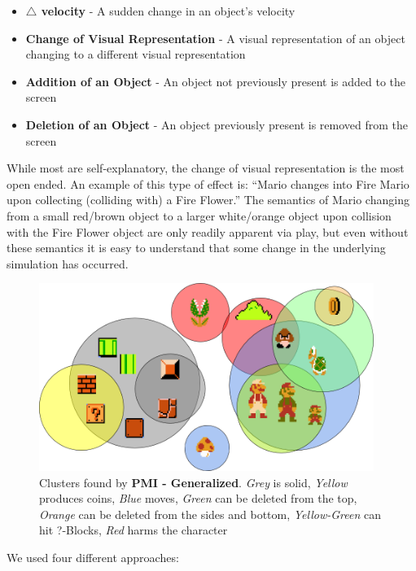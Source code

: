 \documentclass[12pt]{report}
\begin{document}
\begin{itemize}
\item \textbf{$\triangle$ velocity} - A sudden change in an object's velocity
\item  \textbf{Change of Visual Representation} - A visual representation of an object changing to a different visual representation
\item \textbf{Addition of an Object} - An object not previously present is added to the screen
\item \textbf{Deletion of an Object} - An object previously present is removed from the screen
\end{itemize} 

While most are self-explanatory, the change of visual representation is the most open ended.  An example of this type of effect is: ``Mario changes into Fire Mario upon collecting (colliding with) a Fire Flower.'' The semantics of Mario changing from a small red/brown object to a larger white/orange object upon collision with the Fire Flower object are only readily apparent via play, but even without these semantics it is easy to understand that some change in the underlying simulation has occurred.  
\begin{figure}[ht]
\centering
    \includegraphics[width=0.97\textwidth]{figures/Clusters.png} 
   
    \caption{Clusters found by \textbf{PMI - Generalized}. \textit{Grey} is solid, \textit{Yellow} produces coins, \textit{Blue} moves, \textit{Green} can be deleted from the top, \textit{Orange} can be deleted from the sides and bottom, \textit{Yellow-Green} can hit ?-Blocks, \textit{Red} harms the character }
  \label{fig:Clusters}
  \end{figure}

We used four different approaches:
\end{document}
